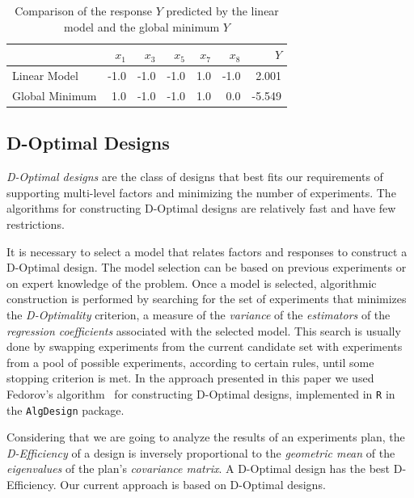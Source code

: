 \documentclass[conference]{IEEEtran}
\begin{document}
\begin{table}[ht]
\centering
\caption{Comparison of the response $Y$ predicted by the linear model and the global minimum $Y$}
\begingroup\footnotesize
\begin{tabular}{lrrrrrr}
  \toprule
 & $x_1$ & $x_3$ & $x_5$ & $x_7$ & $x_8$ & $Y$ \\
  \midrule
Linear Model & -1.0 & -1.0 & -1.0 & 1.0 & -1.0 & 2.001 \\
  Global Minimum & 1.0 & -1.0 & -1.0 & 1.0 & 0.0 & -5.549 \\
   \bottomrule
\end{tabular}
\endgroup
\end{table}
\subsection{D-Optimal Designs}
\label{sec:org965371a}
\emph{D-Optimal designs} are the class of designs that best fits our requirements of
supporting multi-level factors and minimizing the number of experiments. The
algorithms for constructing D-Optimal designs are relatively fast and have few
restrictions.

It is necessary to select a model that relates factors and responses to
construct a D-Optimal design. The model selection can be based on previous
experiments or on expert knowledge of the problem. Once a model is selected,
algorithmic construction is performed by searching for the set of experiments
that minimizes the \emph{D-Optimality} criterion, a measure of the \emph{variance} of the
\emph{estimators} of the \emph{regression coefficients} associated with the selected
model. This search is usually done by swapping experiments from the current
candidate set with experiments from a pool of possible experiments, according to
certain rules, until some stopping criterion is met. In the approach presented
in this paper we used Fedorov's algorithm~\cite{fedorov1972theory} for
constructing D-Optimal designs, implemented in \texttt{R} in the \texttt{AlgDesign} package.

Considering that we are going to analyze the results of an experiments plan, the
\emph{D-Efficiency} of a design is inversely proportional to the \emph{geometric mean} of
the \emph{eigenvalues} of the plan's \emph{covariance matrix}. A D-Optimal design has the
best D-Efficiency. Our current approach is based on D-Optimal designs.
\end{document}
